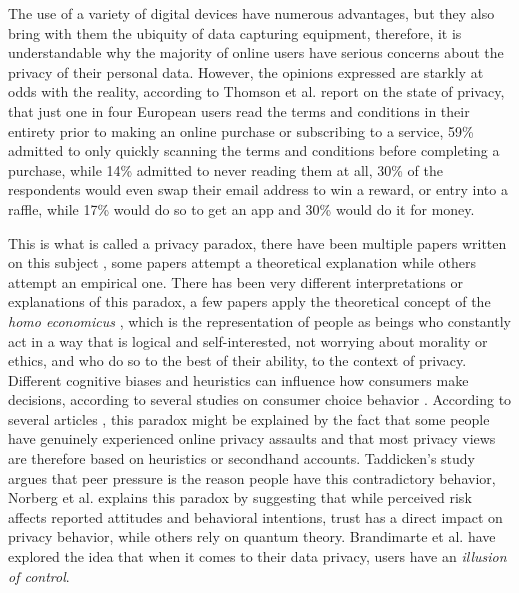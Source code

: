 \documentclass[manuscript,natbib=false]{acmart}
\begin{document}
The use of a variety of digital devices have numerous advantages, but they
also bring with them the ubiquity of data capturing equipment, therefore,
it is understandable why the majority of online users have serious concerns
about the privacy of their personal data. However, the opinions expressed
are starkly at odds with the reality, according to Thomson et al. \cite{DarrenState}
report on the state of privacy, that just one in four European users read
the terms and conditions in their entirety prior to making an online purchase
or subscribing to a service, 59\% admitted to only quickly scanning the
terms and conditions before completing a purchase, while 14\% admitted to
never reading them at all, 30\% of the respondents would even swap their
email address to win a reward, or entry into a raffle, while 17\% would do
so to get an app and 30\% would do it for money.

This is what is called a privacy paradox, there have been multiple papers
written on this subject \cite{solove2021myth, WilliamsPrivacy, lee2021investigating, goad2021privacy, gerber2018explaining},
some papers attempt a theoretical explanation while others attempt an empirical
one. There has been very different interpretations or explanations of this
paradox, a few papers \cite{wilson2012unpacking, warshaw2015can, lee2015privacy}
apply the theoretical concept of the \textit{homo economicus} \cite{zak2008moral},
which is the representation of people as beings who constantly act in a
way that is logical and self-interested, not worrying about morality or
ethics, and who do so to the best of their ability, to the context of privacy.
Different cognitive biases and heuristics can influence how consumers make
decisions, according to several studies on consumer choice behavior \cite{acquisti2007can, knijnenburg2013dimensionality, wakefield2013influence, flender2012type}.
According to several articles \cite{dienlin2015privacy, baek2014solving},
this paradox might be explained by the fact that some people have genuinely
experienced online privacy assaults and that most privacy views are therefore
based on heuristics or secondhand accounts. Taddicken's study \cite{taddicken2014privacy}
argues that peer pressure is the reason people have this contradictory behavior,
Norberg et al. \cite{norberg2007privacy} explains this paradox by suggesting
that while perceived risk affects reported attitudes and behavioral intentions,
trust has a direct impact on privacy behavior, while others \cite{flender2012type, kokolakis2017privacy}
rely on quantum theory. Brandimarte et al. \cite{brandimarte2013misplaced}
have explored the idea that when it comes to their data privacy, users have
an \textit{illusion of control}.
\end{document}
